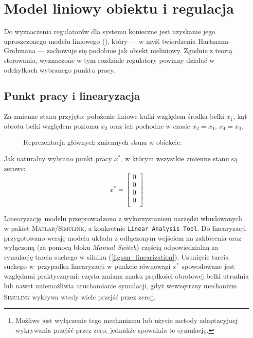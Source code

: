 \chapter{Model liniowy obiektu i regulacja}
\label{cha:ch6_model_liniowy}

Do wyznaczenia regulatorów dla systemu konieczne jest uzyskanie jego uproszczonego modelu liniowego (\cite{TEORIASTER}), który --- w myśl twierdzenia Hartmana-Grobmana --- zachowuje się podobnie jak obiekt nieliniowy. Zgodnie z teorią sterowania, wyznaczone w tym rozdziale regulatory powinny działać w odchyłkach wybranego punktu pracy.

\section{Punkt pracy i linearyzacja}
\label{sec:ch6_punkt_pracy_linearyzacja}

Za zmienne stanu przyjęto: położenie liniowe kulki względem środka belki $x_1$, kąt obrotu belki względem poziomu $x_3$ oraz ich pochodne w czasie $x_2 = \dot{x_1}$, $x_4 = \dot{x_3}$.

\begin{figure}[h]
    \centering
    
    \caption{Reprezentacja głównych zmiennych stanu w obiekcie.}
    \label{fig:zmienne_stanu}
\end{figure}

Jak naturalny wybrano punkt pracy $x^*$, w którym wszystkie zmienne stanu są zerowe:
\begin{equation}
    x^* = \begin{bmatrix}
    0 \\
    0 \\
    0 \\
    0 \\
    \end{bmatrix}
\end{equation}

Linearyzację modelu przeprowadzono z wykorzystaniem narzędzi wbudowanych w pakiet \textsc{Mat\-lab/Si\-mu\-link}, a konkretnie \texttt{Linear Analysis Tool}. Do linearyzacji przygotowano wersję mo\-de\-lu układu z odłączonym wejściem na zakłócenia oraz wyłączoną (za pomocą bloku \textit{Manual Switch}) częścią odpowiedzialną za symulację tarcia suchego w silniku (\cref{fig:sm_linearization}). Usunięcie tarcia suchego w~przypadku linearyzacji w punkcie równowagi $x^*$ spowodowane jest względami praktycznymi: częsta zmiana znaku prędkości obrotowej belki utrudnia lub nawet uniemożliwia uruchamianie symulacji, gdyż wewnętrzny mechanizm \textsc{Simulink} wykrywa wtedy wiele przejść przez zero\footnote{Możliwe jest wyłączenie tego mechanizmu lub użycie metody adaptacyjnej wykrywania przejść przez zero, jednakże spowalnia to symulację.}.

